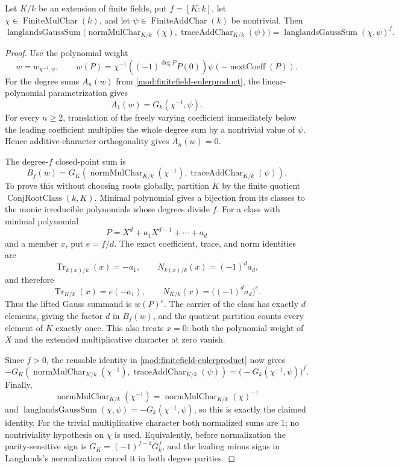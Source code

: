 \begin{theorem}\label{mod:finitefield-hassedavenportlift}
Let $K/k$ be an extension of finite fields, put $f=[K:k]$, let
$\chi\in\operatorname{FiniteMulChar}(k)$, and let
$\psi\in\operatorname{FiniteAddChar}(k)$ be nontrivial.  Then
\[
 \operatorname{langlandsGaussSum}
   \bigl(\operatorname{normMulChar}_{K/k}(\chi),
         \operatorname{traceAddChar}_{K/k}(\psi)\bigr)
 =
 \operatorname{langlandsGaussSum}(\chi,\psi)^f.
\]
\leanok
{}
\FormalizationContract
\end{theorem}
\begin{proof}
Use the polynomial weight
\[
 w=w_{\chi^{-1},\psi},\qquad
 w(P)=\chi^{-1}\!\left((-1)^{\deg P}P(0)\right)
       \psi\!\left(-\operatorname{nextCoeff}(P)\right).
\]
For the degree sums $A_n(w)$ from
\ref{mod:finitefield-eulerproduct}, the linear-polynomial
parametrization gives
\[
 A_1(w)=G_k(\chi^{-1},\psi).
\]
For every $n\geq2$, translation of the freely varying coefficient
immediately below the leading coefficient multiplies the whole degree
sum by a nontrivial value of $\psi$.  Hence additive-character
orthogonality gives $A_n(w)=0$.

The degree-$f$ closed-point sum is
\[
 B_f(w)=
 G_K\!\left(\operatorname{normMulChar}_{K/k}(\chi^{-1}),
            \operatorname{traceAddChar}_{K/k}(\psi)\right).
\]
To prove this without choosing roots globally, partition $K$ by the
finite quotient $\operatorname{ConjRootClass}(k,K)$.  Minimal polynomial
gives a bijection from its classes to the monic irreducible polynomials
whose degrees divide $f$.  For a class with minimal polynomial
\[
 P=X^d+a_1X^{d-1}+\cdots+a_d
\]
and a member $x$, put $e=f/d$.  The exact coefficient, trace, and norm
identities are
\[
 \operatorname{Tr}_{k(x)/k}(x)=-a_1,
 \qquad
 N_{k(x)/k}(x)=(-1)^d a_d,
\]
and therefore
\[
 \operatorname{Tr}_{K/k}(x)=e(-a_1),
 \qquad
 N_{K/k}(x)=\bigl((-1)^d a_d\bigr)^e.
\]
Thus the lifted Gauss summand is $w(P)^e$.  The carrier of the class has
exactly $d$ elements, giving the factor $d$ in $B_f(w)$, and the quotient
partition counts every element of $K$ exactly once.  This also treats
$x=0$: both the polynomial weight of $X$ and the extended multiplicative
character at zero vanish.

Since $f>0$, the reusable identity in
\ref{mod:finitefield-eulerproduct} now gives
\[
 -G_K\!\left(\operatorname{normMulChar}_{K/k}(\chi^{-1}),
             \operatorname{traceAddChar}_{K/k}(\psi)\right)
 =
 \bigl(-G_k(\chi^{-1},\psi)\bigr)^f.
\]
Finally,
\[
 \operatorname{normMulChar}_{K/k}(\chi^{-1})
 =\operatorname{normMulChar}_{K/k}(\chi)^{-1}
\]
and
$\operatorname{langlandsGaussSum}(\chi,\psi)
=-G_k(\chi^{-1},\psi)$, so this is exactly the claimed identity.
For the trivial multiplicative character both normalized sums are $1$;
no nontriviality hypothesis on $\chi$ is used.  Equivalently, before
normalization the parity-sensitive sign is
$G_K=(-1)^{f-1}G_k^f$, and the leading minus signs in Langlands's
normalization cancel it in both degree parities.
\end{proof}
